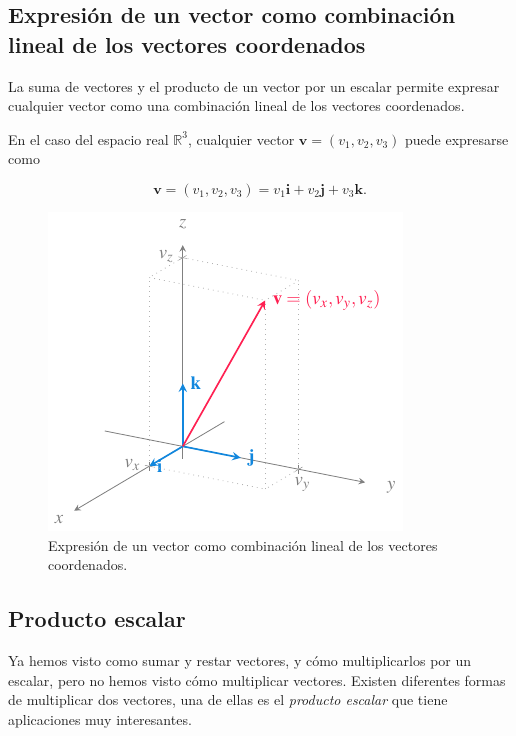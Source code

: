 \documentclass[
  a4paper,
]{scrreport}
\theoremstyle{definition}
\theoremstyle{plain}
\theoremstyle{definition}
\theoremstyle{definition}
\theoremstyle{plain}
\theoremstyle{plain}
\theoremstyle{remark}
\begin{document}
\subsection{Expresión de un vector como combinación lineal de los
vectores
coordenados}\label{expresiuxf3n-de-un-vector-como-combinaciuxf3n-lineal-de-los-vectores-coordenados}

La suma de vectores y el producto de un vector por un escalar permite
expresar cualquier vector como una combinación lineal de los vectores
coordenados.

En el caso del espacio real \(\mathbb{R}^3\), cualquier vector
\(\mathbf{v}=(v_1,v_2,v_3)\) puede expresarse como

\[\mathbf{v}=(v_1,v_2,v_3) = v_1\mathbf{i}+v_2\mathbf{j}+v_3\mathbf{k}.\]

\begin{figure}[H]

{\centering \includegraphics{img/geometria-plano-espacio/combinacion-lineal-vectores-coordenados.pdf}

}

\caption{Expresión de un vector como combinación lineal de los vectores
coordenados.}

\end{figure}%

\subsection{Producto escalar}\label{producto-escalar}

Ya hemos visto como sumar y restar vectores, y cómo multiplicarlos por
un escalar, pero no hemos visto cómo multiplicar vectores. Existen
diferentes formas de multiplicar dos vectores, una de ellas es el
\emph{producto escalar} que tiene aplicaciones muy interesantes.
\end{document}
